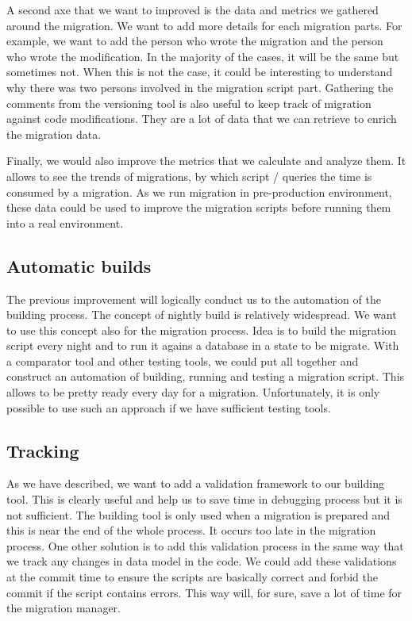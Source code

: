 A second axe that we want to improved is the data and metrics we gathered around the migration. We want to add more details for each migration parts. For example, we want to add the person who wrote the migration and the person who wrote the modification. In the majority of the cases, it will be the same but sometimes not. When this is not the case, it could be interesting to understand why there was two persons involved in the migration script part. Gathering the comments from the versioning tool is also useful to keep track of migration against code modifications. They are a lot of data that we can retrieve to enrich the migration data.

Finally, we would also improve the metrics that we calculate and analyze them. It allows to see the trends of migrations, by which script / queries the time is consumed by a migration. As we run migration in pre-production environment, these data could be used to improve the migration scripts before running them into a real environment.

\subsection{Automatic builds}

The previous improvement will logically conduct us to the automation of the building process. The concept of nightly build is relatively widespread. We want to use this concept also for the migration process. Idea is to build the migration script every night and to run it agains a database in a state to be migrate. With a comparator tool and other testing tools, we could put all together and construct an automation of building, running and testing a migration script. This allows to be pretty ready every day for a migration. Unfortunately, it is only possible to use such an approach if we have sufficient testing tools.

\subsection{Tracking}

As we have described, we want to add a validation framework to our building tool. This is clearly useful and help us to save time in debugging process but it is not sufficient. The building tool is only used when a migration is prepared and this is near the end of the whole process. It occurs too late in the migration process. One other solution is to add this validation process in the same way that we track any changes in data model in the code. We could add these validations at the commit time to ensure the scripts are basically correct and forbid the commit if the script contains errors. This way will, for sure, save a lot of time for the migration manager.
